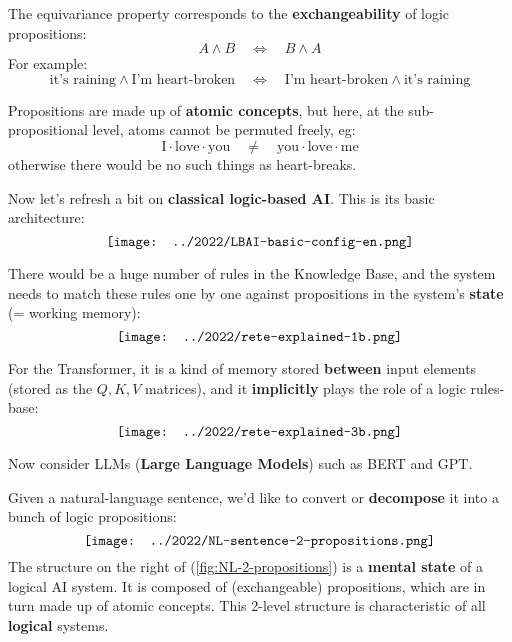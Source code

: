 \begin{preview}
\begin{minipage}{\textwidth}
The equivariance property corresponds to the \textbf{exchangeability} of logic propositions:
\begin{equation}
A \wedge B \quad \Leftrightarrow \quad B \wedge A
\end{equation}
For example:
\begin{equation}
\mbox{it's raining} \wedge \mbox{I'm heart-broken} \quad \Leftrightarrow \quad \mbox{I'm heart-broken} \wedge \mbox{it's raining}
\end{equation}

Propositions are made up of \textbf{atomic concepts}, but here, at the sub-propositional level, atoms cannot be permuted freely, eg:
\begin{equation}
\mbox{I} \cdot \mbox{love} \cdot \mbox{you} \quad \neq \quad \mbox{you} \cdot \mbox{love} \cdot \mbox{me}
\end{equation}
otherwise there would be no such things as heart-breaks.

Now let's refresh a bit on \textbf{classical logic-based AI}.  This is its basic architecture:
\begin{equation}
\vcenter{\hbox{\texttt{[image: ../2022/LBAI-basic-config-en.png]}}}
\end{equation}

There would be a huge number of rules in the Knowledge Base, and the system needs to match these rules one by one against propositions in the system's \textbf{state} (= working memory):
\begin{equation}
\vcenter{\hbox{\texttt{[image: ../2022/rete-explained-1b.png]}}}
\end{equation}

For the Transformer, it is a kind of memory stored \textbf{between} input elements (stored as the $Q, K, V$ matrices), and it \textbf{implicitly} plays the role of a logic rules-base:
\begin{equation}
\label{fig:self-attention-as-Rete}
\vcenter{\hbox{\texttt{[image: ../2022/rete-explained-3b.png]}}}
\end{equation}

Now consider LLMs (\textbf{Large Language Models}) such as BERT and GPT.

Given a natural-language sentence, we'd like to convert or \textbf{decompose} it into a bunch of logic propositions:
\begin{equation}
\label{fig:NL-2-propositions}
\vcenter{\hbox{\texttt{[image: ../2022/NL-sentence-2-propositions.png]}}}
\end{equation}
The structure on the right of (\ref{fig:NL-2-propositions}) is a \textbf{mental state} of a logical AI system.  It is composed of (exchangeable) propositions, which are in turn made up of atomic concepts.  This 2-level structure is characteristic of all \textbf{logical} systems.


\end{minipage}
\end{preview}

